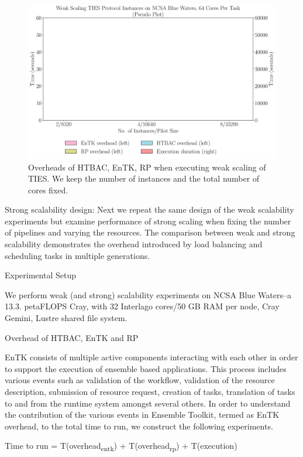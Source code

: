 

\begin{figure}
  \centering
   \includegraphics[width=\columnwidth]{figures/weak_scaling_TIES_instances.pdf}
  \caption{Overheads of HTBAC, EnTK, RP when executing weak scaling of TIES. 
  We keep the number of instances and the total number of cores fixed. }
\label{fig:weak_scaling}
\end{figure}



Strong scalability design: Next we repeat the same design of the weak scalability experiments but examine performance of strong scaling when fixing the number of pipelines and varying the resources. The comparison between weak and strong scalability demonstrates the overhead introduced by load balancing and scheduling tasks in multiple generations.


Experimental Setup

We perform weak (and strong) scalability experiments on NCSA Blue Waters--a 13.3. petaFLOPS Cray, with 32 Interlago cores/50 GB RAM per node, Cray Gemini, Lustre shared file system.

Overhead of HTBAC, EnTK and RP

EnTK consists of multiple active components interacting with each other in order to support the execution of ensemble based applications. This process includes various events such as validation of the workflow, validation of the resource description, submission of resource request, creation of tasks, translation of tasks to and from the runtime system amongst several others. In order to understand the contribution of the various events in Ensemble Toolkit, termed as EnTK overhead, to the total time to run, we construct the following experiments.

Time to run = T(overhead\textsubscript{entk}) + T(overhead\textsubscript{rp}) + T(execution)
